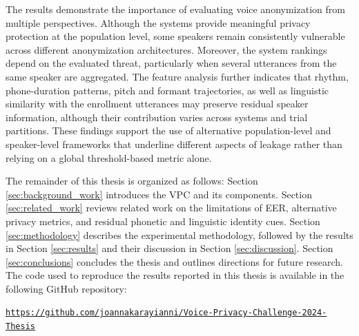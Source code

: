 \documentclass[12pt,leqno,a4paper]{article}
\begin{document}
The results demonstrate the importance of evaluating voice anonymization from multiple perspectives. 
Although the systems provide meaningful privacy protection at the population level, some speakers remain consistently vulnerable across different 
anonymization architectures. Moreover, the system rankings depend on the evaluated threat, particularly when several utterances from the same speaker are 
aggregated. The feature analysis further indicates that rhythm, phone-duration patterns, pitch and formant trajectories, as well as linguistic similarity with the enrollment utterances may 
preserve residual speaker information, although their contribution varies across systems and trial partitions. 
These findings support the use of alternative population-level and speaker-level frameworks that underline different aspects of leakage rather than relying on a global threshold-based metric alone.

The remainder of this thesis is organized as follows: Section \ref{sec:background_work} introduces the VPC and its components. Section \ref{sec:related_work} reviews related work on the limitations of EER, alternative privacy metrics, and residual phonetic and linguistic identity cues. 
Section \ref{sec:methodology} describes the experimental methodology, followed by the results in Section \ref{sec:results} and their discussion in Section \ref{sec:discussion}. Section \ref{sec:conclusions} concludes the thesis and outlines directions for future research. The code used to reproduce the results
reported in this thesis is available in the following GitHub repository:
\par\noindent
\href{https://github.com/joannakarayianni/Voice-Privacy-Challenge-2024-Thesis}{\texttt{https://github.com/joannakarayianni/Voice-Privacy-Challenge-2024-Thesis}}

\end{document}
